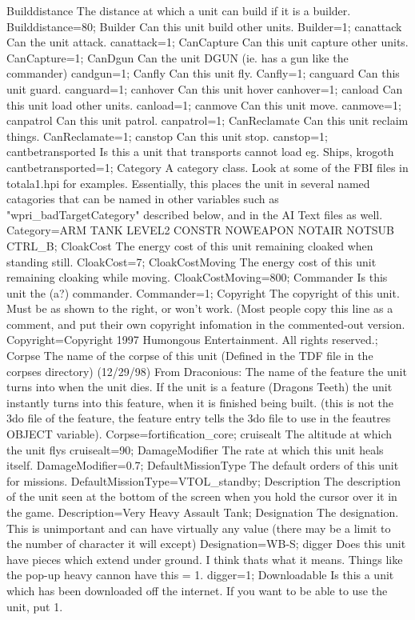 \documentclass[a4paper,10pt]{article}
\begin{document}
Builddistance 	The distance at which a unit can build if it is a builder. 	Builddistance=80;
Builder 	Can this unit build other units. 	Builder=1;
canattack 	Can the unit attack. 	canattack=1;
CanCapture 	Can this unit capture other units. 	CanCapture=1;
CanDgun 	Can the unit DGUN (ie. has a gun like the commander) 	candgun=1;
Canfly 	Can this unit fly. 	Canfly=1;
canguard 	Can this unit guard. 	canguard=1;
canhover 	Can this unit hover 	canhover=1;
canload 	Can this unit load other units. 	canload=1;
canmove 	Can this unit move. 	canmove=1;
canpatrol 	Can this unit patrol. 	canpatrol=1;
CanReclamate 	Can this unit reclaim things. 	CanReclamate=1;
canstop 	Can this unit stop. 	canstop=1;
cantbetransported 	Is this a unit that transports cannot load eg. Ships, krogoth 	cantbetransported=1;
Category 	A category class. Look at some of the FBI files in totala1.hpi for examples.  Essentially, this places the unit in several named catagories that can be named in other variables such as "wpri\_badTargetCategory" described below, and in the AI Text files as well. 	Category=ARM TANK LEVEL2 CONSTR NOWEAPON NOTAIR NOTSUB CTRL\_B;
CloakCost 	The energy cost of this unit remaining cloaked when standing still. 	CloakCost=7;
CloakCostMoving 	The energy cost of this unit remaining cloaking while moving. 	CloakCostMoving=800;
Commander 	Is this unit the (a?) commander. 	Commander=1;
Copyright 	The copyright of this unit. Must be as shown to the right, or won't work.  (Most people copy this line as a comment, and put their own copyright infomation in the commented-out version. 	Copyright=Copyright 1997 Humongous Entertainment. All rights reserved.;
Corpse 	The name of the corpse of this unit (Defined in the TDF file in the corpses directory)  (12/29/98)  From Draconious:  The name of the feature the unit turns into when the unit dies. If the unit is a feature (Dragons Teeth) the unit instantly turns into this feature, when it is finished being built. (this is not the 3do file of the feature, the feature entry tells the 3do file to use in the feautres OBJECT variable). 	Corpse=fortification\_core;
cruisealt 	The altitude at which the unit flys 	cruisealt=90;
DamageModifier 	The rate at which this unit heals itself. 	DamageModifier=0.7;
DefaultMissionType 	The default orders of this unit for missions. 	DefaultMissionType=VTOL\_standby;
Description 	The description of the unit seen at the bottom of the screen when you hold the cursor over it in the game. 	Description=Very Heavy Assault Tank;
Designation 	The designation. This is unimportant and can have virtually any value (there may be a limit to the number of character it will except) 	Designation=WB-S;
digger 	Does this unit have pieces which extend under ground.  I think thats what it means. Things like the pop-up heavy cannon have this = 1. 	digger=1;
Downloadable 	Is this a unit which has been downloaded off the internet. If you want to be able to use the unit, put 1.
\end{document}
